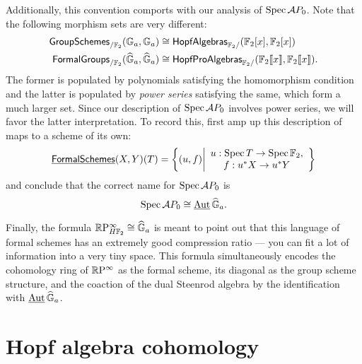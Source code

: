 \begin{example}
Additionally, this convention comports with our analysis of $\operatorname{Spec} \mathcal AP_0$.  Note that the following morphism sets are very different:
\begin{align*}
\mathsf{GroupSchemes}_{/\mathbb F_2}(\mathbb G_a, \mathbb G_a) & \cong \mathsf{HopfAlgebras}_{\mathbb F_2/}(\mathbb F_2[x], \mathbb F_2[x]) \\
\mathsf{FormalGroups}_{/\mathbb F_2}(\widehat{\mathbb G}_a, \widehat{\mathbb G}_a) & \cong \mathsf{HopfProAlgebras}_{\mathbb F_2/}(\mathbb F_2\llbracket x \rrbracket, \mathbb F_2\llbracket x \rrbracket).
\end{align*}
The former is populated by polynomials satisfying the homomorphism condition and the latter is populated by \emph{power series} satisfying the same, which form a much larger set.  Since our description of $\operatorname{Spec} \mathcal AP_0$ involves power series, we will favor the latter interpretation.  To record this, first amp up this description of maps to a scheme of its own: \[\operatorname{\underline{\smash{\mathsf{FormalSchemes}}}}(X, Y)(T) = \left\{ (u, f) \middle| \begin{array}{c} u: \operatorname{Spec} T \to \operatorname{Spec} \mathbb F_2, \\ f: u^* X \to u^* Y \end{array}\right\}\] and conclude that the correct name for $\operatorname{Spec} \mathcal AP_0$ is \[\operatorname{Spec} \mathcal AP_0 \cong \operatorname{\underline{\smash{\operatorname{Aut}}}} \widehat{\mathbb G}_a.\]
\end{example}

Finally, the formula $\mathbb R\mathrm P^\infty_{H\mathbb F_2} \cong \widehat{\mathbb G}_a$ is meant to point out that this language of formal schemes has an extremely good compression ratio --- you can fit a lot of information into a very tiny space.  This formula simultaneously encodes the cohomology ring of $\mathbb R\mathrm P^\infty$ as the formal scheme, its diagonal as the group scheme structure, and the coaction of the dual Steenrod algebra by the identification with $\operatorname{\underline{\smash{\operatorname{Aut}}}}{\widehat{\mathbb G}_a}$.







\section{Hopf algebra cohomology}\label{HopfAlgebraLecture}

